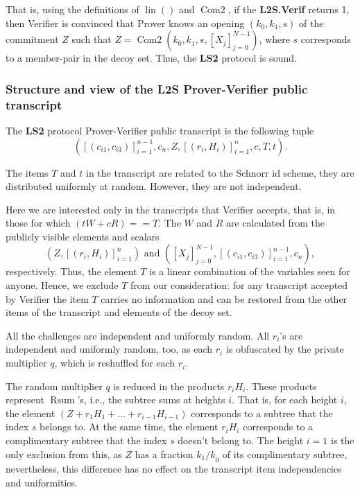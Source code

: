\documentclass{mathcryptology} %
\DeclareMathOperator{\lin}{lin}
\DeclareMathOperator{\Rsum}{Rsum}
\DeclareMathOperator{\ComTwo}{Com2}
\theoremstyle{title}
\theoremstyle{titleof}
\begin{document}
    That is, using the definitions of $\lin()$ and $\ComTwo$, if the \textbf{L2S.Verif} returns 1, then Verifier is convinced that Prover knows an opening $\left(k_{0}, k_{1}, s\right)$ of the commitment $Z$ such that $Z=\ComTwo\left(k_{0}, k_{1}, s, {\left[X_{j}\right]}_{j=0}^{N-1}\right)$, where $s$ corresponds to a member-pair in the decoy set. Thus, the \textbf{LS2} protocol is sound.


\subsubsection{Structure and view of the L2S Prover-Verifier public transcript}\label{Sec:6.3.3.}
    The \textbf{LS2} protocol Prover-Verifier public transcript is the following tuple
    \begin{equation*}
        \left({\left[\left(c_{i1},c_{i3}\right)\right]}_{i=1}^{n-1}, c_{n}, Z,
        {\left[\left(r_{i}, H_{i}\right)\right]}_{i=1}^n, c, T, t \right).
    \end{equation*}

    The items $T$ and $t$ in the transcript are related to the Schnorr id scheme, they are distributed uniformly at random. However, they are not independent.

    Here we are interested only in the transcripts that Verifier accepts, that is, in those for which $\left(tW+cR\right)==T$. The $W$ and $R$ are calculated from the publicly visible elements and scalars
    \begin{equation*}
        \left(Z, {\left[\left(r_{i}, H_{i}\right)\right]}_{i=1}^n\right) \text{ and } \left({\left[X_{j}\right]}_{j=0}^{N-1}, {\left[\left(c_{i1}, c_{i3}\right)\right]}_{i=1}^{n-1}, c_{n}\right),
    \end{equation*}
    respectively. Thus, the element $T$ is a linear combination of the variables seen for anyone. Hence, we exclude $T$ from our consideration: for any transcript accepted by Verifier the item $T$ carries no information and can be restored from the other items of the transcript and elements of the decoy set.

    All the challenges are independent and uniformly random. All $r_{i}$'s are independent and uniformly random, too, as each $r_{i}$ is obfuscated by the private multiplier $q$, which is reshuffled for each $r_{i}$.

    The random multiplier $q$ is reduced in the products $r_{i}H_{i}$. These products represent $\Rsum$'s, i.e., the subtree sums at heights $i$. That is, for each height $i$, the element $\left(Z+r_{1}H_{1}+\dots{}+r_{i-1}H_{i-1}\right)$ corresponds to a subtree that the index $s$ belongs to. At the same time, the element $r_{i}H_{i}$ corresponds to a complimentary subtree that the index $s$ doesn't belong to. The height $i=1$ is the only exclusion from this, as $Z$ has a fraction $k_{1}{/k}_{0}$ of its complimentary subtree, nevertheless, this difference has no effect on the transcript item independencies and uniformities.
\end{document}
